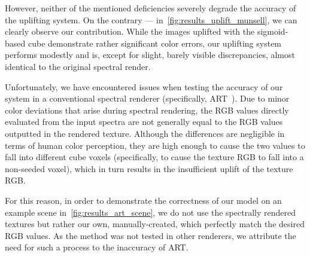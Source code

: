 However, neither of the mentioned deficiencies severely degrade the accuracy of the uplifting system. On the contrary --- in~\cref{fig:results_uplift_munsell}, we can clearly observe our contribution. While the images uplifted with the sigmoid-based cube demonstrate rather significant color errors, our uplifting system performs modestly and is, except for slight, barely visible discrepancies, almost identical to the original spectral render.

Unfortunately, we have encountered issues when testing the accuracy of our system in a conventional spectral renderer (specifically, ART~\cite{ART}). Due to minor color deviations that arise during spectral rendering, the RGB values directly evaluated from the input spectra are not generally equal to the RGB values outputted in the rendered texture. Although the differences are negligible in terms of human color perception, they are high enough to cause the two values to fall into different cube voxels (specifically, to cause the texture RGB to fall into a non-seeded voxel), which in turn results in the insufficient uplift of the texture RGB.

For this reason, in order to demonstrate the correctness of our model on an example scene in~\cref{fig:results_art_scene}, we do not use the spectrally rendered textures but rather our own, manually-created, which perfectly match the desired RGB values. As the method was not tested in other renderers, we attribute the need for such a process to the inaccuracy of ART. 

